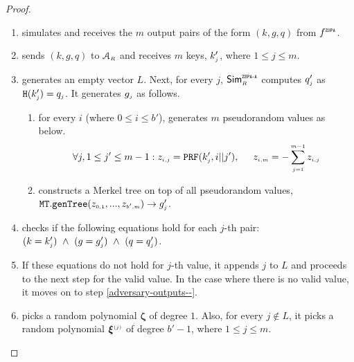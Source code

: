 \begin{proof}
\begin{enumerate}
%
\item simulates  \zspa and receives the $m$ output pairs of the form $( k,  g,  q) $ from $f^{\scriptscriptstyle \mathtt{ZSPA}}$.
%
\item sends $( k,  g,  q) $ to $\mathcal{A}_{\scriptscriptstyle R}$ and receives $m$ keys, $ k'_{\scriptscriptstyle j}$, where $1\leq j \leq m$. 
%
\item\label{ZSPA-A-Case-2-generate-z} generates an empty vector $ L$. Next, for every $j$, $\mathsf{Sim}^{\scriptscriptstyle \mathtt{ZSPA\text{-}A}}_{\scriptscriptstyle R}$ computes $q'_{\scriptscriptstyle j}$ as $\mathtt {H}( k'_{\scriptscriptstyle j})=q_{\scriptscriptstyle j}$.  It generates $g_{\scriptscriptstyle j}$ as follows. 


\begin{enumerate}

\item\label{gen-pr-vals} for every $i$ (where $0\leq i \leq b'$), generates $m$ pseudorandom values as below. 
%
 $$\forall j, 1\leq j' \leq m-1: z_{\scriptscriptstyle i,j}=\mathtt{PRF}( k'_{\scriptscriptstyle j},i||j'), \hspace{5mm} z_{\scriptscriptstyle i,m}=-\sum\limits^{\scriptscriptstyle m-1}_{\scriptscriptstyle j=1}z_{\scriptscriptstyle i,j}$$
%
\item   constructs a Merkel tree on top of all pseudorandom values,  $\mathtt{MT.genTree}(z_{\scriptscriptstyle 0,1},...,z_{\scriptscriptstyle b', m})\rightarrow  g'_{\scriptscriptstyle j}$. 
%
\end{enumerate}
%
\item checks if the following equations hold for each $j$-th pair: 
%
$( k=    k'_{\scriptscriptstyle j}) \ \wedge\  ( g=   g'_{\scriptscriptstyle j})  \ \wedge\ ( q=  q'_{\scriptscriptstyle j})$.
%
%
\item If these equations do not hold for $j$-th value, it appends $j$ to $ L$ and proceeds to the next step for the valid value. In the case where there is no valid value, it moves on to step \ref{adversary-outputs--}. 


\item picks a random polynomial ${\bm \zeta}$ of degree $1$. Also, for every $j\notin  L$, it picks a random polynomial ${\bm\xi}^{\scriptscriptstyle (j)}$ of degree $b'-1$, where $1\leq j \leq m$. 
%


\end{enumerate}
\end{proof}
